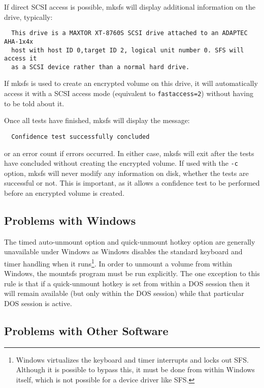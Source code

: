 If direct SCSI access is possible, mksfs will display additional information on the drive,
typically:
{\small
\begin{verbatim}
  This drive is a MAXTOR XT-8760S SCSI drive attached to an ADAPTEC AHA-1x4x
  host with host ID 0,target ID 2, logical unit number 0. SFS will access it
  as a SCSI device rather than a normal hard drive.
\end{verbatim}
}
If mksfs is used to create an encrypted volume on this drive, it will
automatically access it with a SCSI access mode (equivalent to {\tt fastaccess=2})
without having to be told about it.

Once all tests have finished, mksfs will display the message:

\verb|  |{\tt Confidence test successfully concluded}

or an error count if errors occurred.  In either case, mksfs will exit after 
the tests have concluded without creating the encrypted volume.  If used with 
the {\tt -c} option, mksfs will never modify any information on disk, whether the 
tests are successful or not.  This is important, as it allows a confidence test 
to be performed before an encrypted volume is created.


\subsection{Problems with Windows}

The timed auto-unmount option and quick-unmount hotkey option are generally
unavailable under Windows as Windows disables the standard keyboard and timer
handling when it runs\footnote{
              Windows virtualizes the keyboard and timer interrupts and locks
              out SFS.  Although it is possible to bypass this, it must be done
              from within Windows itself, which is not possible for a device
              driver like SFS.
}.  In order to unmount a volume from within Windows,
the mountsfs program must be run explicitly.  The one exception to this rule is
that if a quick-unmount hotkey is set from within a DOS session then it will
remain available (but only within the DOS session) while that particular DOS
session is active.


\subsection{Problems with Other Software}

